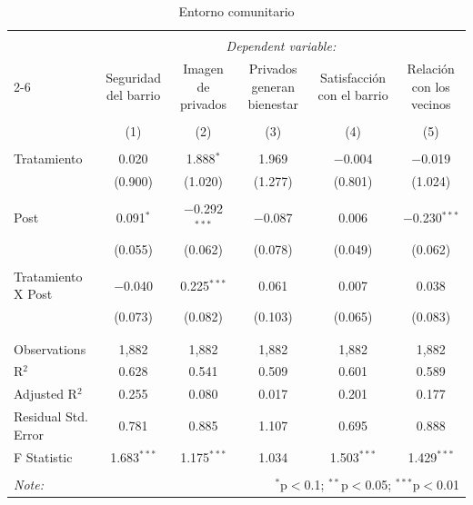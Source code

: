 
\begin{table}[H] \centering 
  \caption{Entorno comunitario} 
  \label{reg_entorno} 
\tiny 
\begin{tabular}{@{\extracolsep{-7pt}}lccccc} 
\\[-1.8ex]\hline 
\hline \\[-1.8ex] 
 & \multicolumn{5}{c}{\textit{Dependent variable:}} \\ 
\cline{2-6} 
 & Seguridad del barrio & Imagen de privados & Privados generan bienestar & Satisfacción con el barrio & Relación con los vecinos \\ 
\\[-1.8ex] & (1) & (2) & (3) & (4) & (5)\\ 
\hline \\[-1.8ex] 
 Tratamiento & 0.020 & 1.888$^{*}$ & 1.969 & $-$0.004 & $-$0.019 \\ 
  & (0.900) & (1.020) & (1.277) & (0.801) & (1.024) \\ 
  & & & & & \\ 
 Post & 0.091$^{*}$ & $-$0.292$^{***}$ & $-$0.087 & 0.006 & $-$0.230$^{***}$ \\ 
  & (0.055) & (0.062) & (0.078) & (0.049) & (0.062) \\ 
  & & & & & \\ 
 Tratamiento X Post & $-$0.040 & 0.225$^{***}$ & 0.061 & 0.007 & 0.038 \\ 
  & (0.073) & (0.082) & (0.103) & (0.065) & (0.083) \\ 
  & & & & & \\ 
\hline \\[-1.8ex] 
Observations & 1,882 & 1,882 & 1,882 & 1,882 & 1,882 \\ 
R$^{2}$ & 0.628 & 0.541 & 0.509 & 0.601 & 0.589 \\ 
Adjusted R$^{2}$ & 0.255 & 0.080 & 0.017 & 0.201 & 0.177 \\ 
Residual Std. Error & 0.781 & 0.885 & 1.107 & 0.695 & 0.888 \\ 
F Statistic & 1.683$^{***}$ & 1.175$^{***}$ & 1.034 & 1.503$^{***}$ & 1.429$^{***}$ \\ 
\hline 
\hline \\[-1.8ex] 
\textit{Note:}  & \multicolumn{5}{r}{$^{*}$p$<$0.1; $^{**}$p$<$0.05; $^{***}$p$<$0.01} \\ 
\end{tabular} 
\end{table} 

